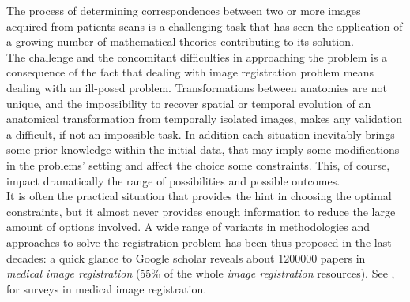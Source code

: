 The process of determining correspondences between two or more images acquired from patients scans is a challenging task that has seen the application of a growing number of mathematical theories contributing to its solution.\\
The challenge and the concomitant difficulties in approaching the problem is a consequence of the fact that dealing with image registration problem means dealing with an ill-posed problem. Transformations between anatomies are not unique, and the impossibility to recover spatial or temporal evolution of an anatomical transformation from temporally isolated images, makes any validation a difficult, if not an impossible task. 
In addition each situation inevitably brings some prior knowledge within the initial data, that may imply some modifications in the problems' setting and affect the choice some constraints. This, of course, impact dramatically the range of possibilities and possible outcomes. \\
It is often the practical situation that provides the hint in choosing the optimal constraints, but it almost never provides enough information to reduce the large amount of options involved. A wide range of variants in methodologies and approaches to solve the registration problem has been thus proposed in the last decades: a quick glance to Google scholar reveals about $1200000$ papers in \emph{medical image registration} (55\% of the whole \emph{image registration} resources). See \cite{Sotiras:survey:13}, \cite{zitova2003image} for surveys in medical image registration.

